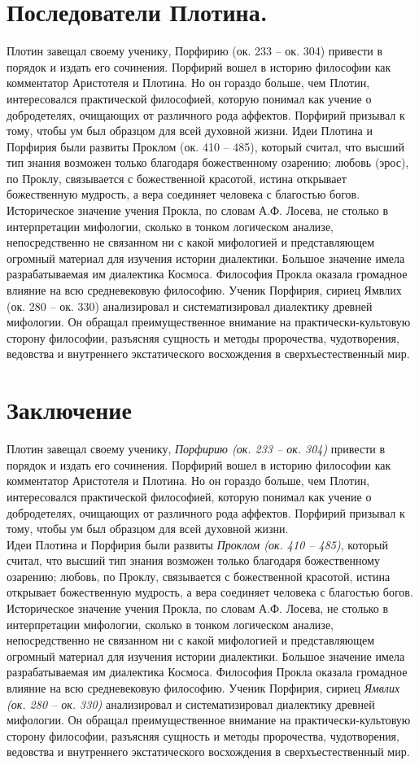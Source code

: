 \documentclass[a4paper,12pt]{article}
\begin{document}
\part{Последователи Плотина.}
Плотин завещал своему ученику, Порфирию (ок. 233 – ок. 304) привести в порядок и издать его сочинения. Порфирий вошел в историю философии как комментатор Аристотеля и Плотина. Но он гораздо больше, чем Плотин, интересовался практической философией, которую понимал как учение о добродетелях, очищающих от различного рода аффектов. Порфирий призывал к тому, чтобы ум был образцом для всей духовной жизни.
Идеи Плотина и Порфирия были развиты Проклом (ок. 410 – 485), который считал, что высший тип знания возможен только благодаря божественному озарению; любовь (эрос), по Проклу, связывается с божественной красотой, истина открывает божественную мудрость, а вера соединяет человека с благостью богов. Историческое значение учения Прокла, по словам А.Ф. Лосева, не столько в интерпретации мифологии, сколько в тонком логическом анализе, непосредственно не связанном ни с какой мифологией и представляющем огромный материал для изучения истории диалектики. Большое значение имела разрабатываемая им диалектика Космоса. Философия Прокла оказала громадное влияние на всю средневековую философию.
Ученик Порфирия, сириец Ямвлих (ок. 280 – ок. 330) анализировал и систематизировал диалектику древней мифологии. Он обращал преимущественное внимание на практически-культовую сторону философии, разъясняя сущность и методы пророчества, чудотворения, ведовства и внутреннего экстатического восхождения в сверхъестественный мир.
\newpage
\part{Заключение}
Плотин завещал своему ученику, \textit{Порфирию (ок. 233 – ок. 304)} привести в порядок и издать его сочинения. Порфирий вошел в историю философии как комментатор Аристотеля и Плотина. Но он гораздо больше, чем Плотин, интересовался практической философией, которую понимал как учение о добродетелях, очищающих от различного рода аффектов. Порфирий призывал к тому, чтобы ум был образцом для всей духовной жизни.\\

Идеи Плотина и Порфирия были развиты \textit{Проклом (ок. 410 – 485)}, который считал, что высший тип знания возможен только благодаря божественному озарению; любовь, по Проклу, связывается с божественной красотой, истина открывает божественную мудрость, а вера соединяет человека с благостью богов. Историческое значение учения Прокла, по словам А.Ф. Лосева, не столько в интерпретации мифологии, сколько в тонком логическом анализе, непосредственно не связанном ни с какой мифологией и представляющем огромный материал для изучения истории диалектики. Большое значение имела разрабатываемая им диалектика Космоса. Философия Прокла оказала громадное влияние на всю средневековую философию.
Ученик Порфирия, сириец \textit{Ямвлих (ок. 280 – ок. 330)} анализировал и систематизировал диалектику древней мифологии. Он обращал преимущественное внимание на практически-культовую сторону философии, разъясняя сущность и методы пророчества, чудотворения, ведовства и внутреннего экстатического восхождения в сверхъестественный мир.     
\end{document}
